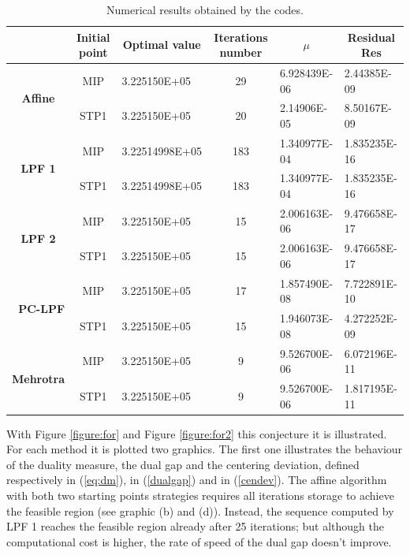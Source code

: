 \documentclass[a4paper,10 pt,titlepage,twoside]{book}
\theoremstyle{plain}
\theoremstyle{definition}
\theoremstyle{remark}
\begin{document}
\begin{table}[]\caption{\label{table:PNV}Numerical results obtained by the codes.}
	\begin{tabular}{cclcll}
		\hline		\textbf{} & \textbf{Initial point} & \multicolumn{1}{c}{\textbf{Optimal value}} & \textbf{Iterations number} & \multicolumn{1}{c}{\textbf{$\mu$}} & \multicolumn{1}{c}{\textbf{Residual} Res} \\ \hline
		\multicolumn{1}{c|}{\multirow{2}{*}{\textbf{Affine}}} & MIP & 3.225150E+05 & 29 & 6.928439E-06 & 2.44385E-09 \\
		\multicolumn{1}{c|}{} & STP1 & 3.225150E+05 & 20 & 2.14906E-05 & 8.50167E-09 \\ \hline
		\multicolumn{1}{c|}{\multirow{2}{*}{\textbf{LPF 1}}} & MIP & 3.22514998E+05 & 183 & 1.340977E-04 & 1.835235E-16 \\
		\multicolumn{1}{c|}{} & STP1 & 3.22514998E+05 & 183 & 1.340977E-04 & 1.835235E-16 \\ \hline
		\multicolumn{1}{c|}{\multirow{2}{*}{\textbf{LPF 2}}} & MIP & 3.225150E+05 & 15 & 2.006163E-06 & 9.476658E-17 \\
		\multicolumn{1}{c|}{} & STP1 & 3.225150E+05 & 15 & 2.006163E-06 & 9.476658E-17 \\ \hline
		\multicolumn{1}{r|}{\multirow{2}{*}{\textbf{PC-LPF}}} & MIP & 3.225150E+05 & 17 & 1.857490E-08 & 7.722891E-10 \\
		\multicolumn{1}{r|}{} & STP1 & 3.225150E+05 & 15 & 1.946073E-08 & 4.272252E-09 \\ \hline
		\multicolumn{1}{c|}{\multirow{2}{*}{\textbf{Mehrotra}}} & MIP & 3.225150E+05 & 9 & 9.526700E-06 & 6.072196E-11 \\
		\multicolumn{1}{c|}{} & STP1 & 3.225150E+05 & 9 & 9.526700E-06 & 1.817195E-11 \\ \hline
	\end{tabular}
\end{table}
With Figure \ref{figure:for} and Figure \ref{figure:for2} this conjecture it is illustrated.\\
For each method it is plotted two graphics. The first one illustrates the behaviour of the duality measure, the dual gap and the centering deviation, defined respectively in (\ref{eq:dm}), in (\ref{dualgap}) and in (\ref{cendev}). 
The affine algorithm with both two starting points strategies requires all iterations storage to achieve the feasible region (see graphic (b) and (d)). Instead, the sequence computed by LPF 1 reaches the feasible region already after 25 iterations; but although the computational cost is higher, the rate of speed of the dual gap doesn't improve.  
\end{document}

